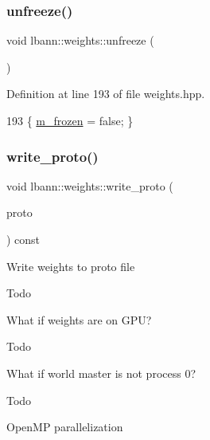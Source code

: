 \subsubsection{\texorpdfstring{unfreeze()}{unfreeze()}}
{\footnotesize\ttfamily void lbann\+::weights\+::unfreeze (\begin{DoxyParamCaption}{ }\end{DoxyParamCaption})\hspace{0.3cm}{\ttfamily [inline]}}



Definition at line 193 of file weights.\+hpp.


\begin{DoxyCode}
193 \{ \hyperlink{classlbann_1_1weights_a3962305112ba98ef2eb89c6f7035f6dd}{m\_frozen} = \textcolor{keyword}{false}; \}
\end{DoxyCode}
\mbox{\label{classlbann_1_1weights_a1a2631987f38d32a90fbee61053a04cc}} 
\subsubsection{\texorpdfstring{write\+\_\+proto()}{write\_proto()}}
{\footnotesize\ttfamily void lbann\+::weights\+::write\+\_\+proto (\begin{DoxyParamCaption}\item[{lbann\+\_\+data\+::\+Weights\+Data $\ast$}]{proto }\end{DoxyParamCaption}) const\hspace{0.3cm}{\ttfamily [virtual]}}

Write weights to proto file \begin{DoxyRefDesc}{Todo}
\item[\hyperlink{todo__todo000011}{Todo}]What if weights are on G\+PU? \end{DoxyRefDesc}


\begin{DoxyRefDesc}{Todo}
\item[\hyperlink{todo__todo000012}{Todo}]What if world master is not process 0? \end{DoxyRefDesc}


\begin{DoxyRefDesc}{Todo}
\item[\hyperlink{todo__todo000013}{Todo}]Open\+MP parallelization \end{DoxyRefDesc}


